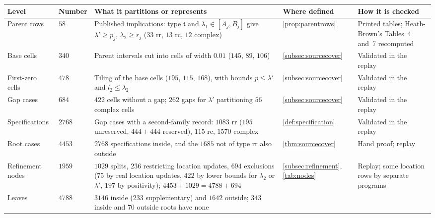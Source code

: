 \documentclass[11pt]{amsart}
\numberwithin{equation}{section}
\theoremstyle{plain}
\theoremstyle{definition}
\theoremstyle{remark}
\newcommand{\1}{\mathbf{1}}
\begin{document}
\begin{table}[tp]
\centering
\footnotesize
\setlength{\tabcolsep}{4pt}
\begin{tabular}{@{}>{\raggedright\arraybackslash}p{}
                >{\raggedleft\arraybackslash}p{}
                >{\raggedright\arraybackslash}p{}
                >{\raggedright\arraybackslash}p{}
                >{\raggedright\arraybackslash}p{}@{}}
\toprule
Level & Number & What it partitions or represents & Where defined & How it is checked\\
\midrule
Parent rows & $58$ &
  Published implications: type $\mathfrak t$ and $\lambda_1\in[A_j,B_j]$ give $\lambda'\ge p_j$,
  $\lambda_2\ge r_j$ ($33$ $\mathrm{rr}$, $13$ $\mathrm{rc}$, $12$ $\mathrm{complex}$) &
  \cref{prop:parentrows} &
  Printed tables; Heath-Brown's Tables~4 and~7 recomputed\\
Base cells & $340$ &
  Parent intervals cut into cells of width $0.01$ ($145$, $89$, $106$) &
  \cref{subsec:sourcecover} &
  Validated in the replay\\
First-zero cells & $478$ &
  Tiling of the base cells ($195$, $115$, $168$), with bounds $p\le\lambda'$ and $l_2\le\lambda_2$ &
  \cref{subsec:sourcecover} &
  Validated in the replay\\
Gap cases & $684$ &
  $422$ cells without a gap; $262$ gaps for $\lambda'$ partitioning $56$ $\mathrm{complex}$ cells &
  \cref{subsec:sourcecover} &
  Validated in the replay\\
Specifications & $2768$ &
  Gap cases with a second-family record: $1083$ $\mathrm{rr}$ ($195$ unreserved, $444+444$
  reserved), $115$ $\mathrm{rc}$, $1570$ $\mathrm{complex}$ &
  \cref{def:specification} &
  Validated in the replay\\
Root cases & $4453$ &
  $2768$ specifications inside, and the $1685$ not of type $\mathrm{rr}$ also outside &
  \cref{thm:sourcecover} &
  Hand proof; replay\\
Refinement nodes & $1959$ &
  $1029$ splits, $236$ restricting location updates, $694$ exclusions ($75$ by real location updates, $422$ by
  lower bounds for $\lambda_2$ or $\lambda'$, $197$ by positivity); $4453+1029=4788+694$ &
  \cref{subsec:refinement}, \cref{tab:nodes} &
  Replay; some location rows by separate programs\\
Leaves & $4788$ &
  $3146$ inside ($233$ supplementary) and $1642$ outside; $343$ inside and $70$ outside roots have none &

\end{tabular}
\end{table}
\end{document}
